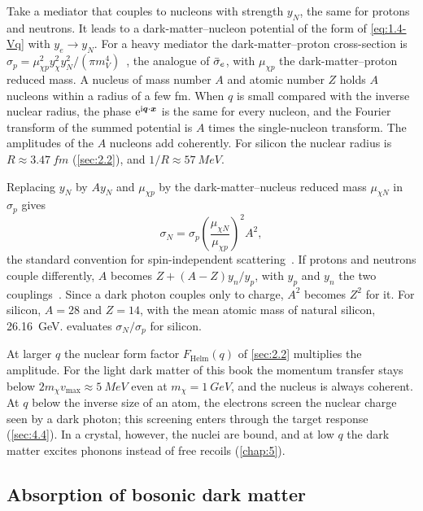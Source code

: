 Take a mediator that couples to nucleons with strength $y_N$, the same for protons and neutrons. It leads to a dark-matter--nucleon potential of the form of \cref{eq:1.4-Vq} with $y_e \to y_N$. For a heavy mediator the dark-matter--proton cross-section is $\sigma_p = \mu_{\chi p}^2 y_\chi^2 y_N^2/(\pi m_V^4)$~\cite[Eq.~(99)]{lin2019tasi}, the analogue of $\bar{\sigma}_{e}$, with $\mu_{\chi p}$ the dark-matter--proton reduced mass. A nucleus of mass number $A$ and atomic number $Z$ holds $A$ nucleons within a radius of a few fm. When $q$ is small compared with the inverse nuclear radius, the phase $\mathrm{e}^{\mathrm{i}\bm{q}\cdot\bm{x}}$ is the same for every nucleon, and the Fourier transform of the summed potential is $A$ times the single-nucleon transform. The amplitudes of the $A$ nucleons add coherently. For silicon the nuclear radius is $R \approx \SI{3.47}{fm}$ (\cref{sec:2.2}), and $1/R \approx \SI{57}{MeV}$.

Replacing $y_N$ by $Ay_N$ and $\mu_{\chi p}$ by the dark-matter--nucleus reduced mass $\mu_{\chi N}$ in $\sigma_p$ gives
\begin{equation}
  \sigma_N = \sigma_p\left(\frac{\mu_{\chi N}}{\mu_{\chi p}}\right)^2 A^2 ,
  \label{eq:1.4-sigmaN}
\end{equation}
the standard convention for spin-independent scattering~\cites{lewin1996review}[Eq.~(104)]{lin2019tasi}. If protons and neutrons couple differently, $A$ becomes $Z + (A - Z)y_n/y_p$, with $y_p$ and $y_n$ the two couplings~\cite[Eq.~(104)]{lin2019tasi}. Since a dark photon couples only to charge, $A^2$ becomes $Z^2$ for it. For silicon, $A = 28$ and $Z = 14$, with the mean atomic mass of natural silicon, \SI{26.16}{GeV}.  evaluates $\sigma_N/\sigma_p$ for silicon.

At larger $q$ the nuclear form factor $F_{\mathrm{Helm}}(q)$ of \cref{sec:2.2} multiplies the amplitude. For the light dark matter of this book the momentum transfer stays below $2m_\chi v_{\mathrm{max}} \approx \SI{5}{MeV}$ even at $m_\chi = \SI{1}{GeV}$, and the nucleus is always coherent. At $q$ below the inverse size of an atom, the electrons screen the nuclear charge seen by a dark photon; this screening enters through the target response (\cref{sec:4.4}). In a crystal, however, the nuclei are bound, and at low $q$ the dark matter excites phonons instead of free recoils (\cref{chap:5}).

\subsection{Absorption of bosonic dark matter}

